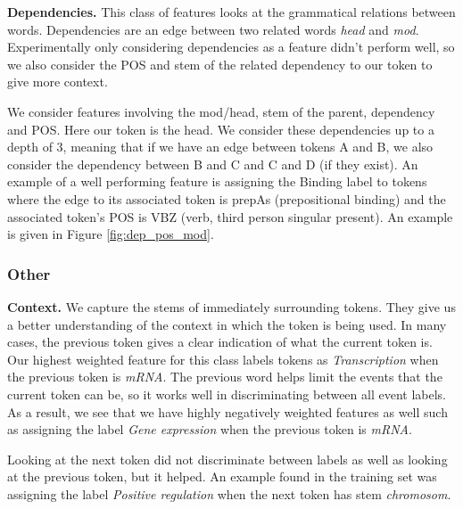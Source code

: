 \documentclass{article} %
\begin{document}
\textbf{Dependencies.} \cite{4} This class of features looks at the grammatical relations between words. Dependencies are an edge between two related words \emph{head} and \emph{mod}. Experimentally only considering dependencies as a feature didn't perform well, so we also consider the POS and stem of the related dependency to our token to give more context. 

We consider features involving the mod/head, stem of the parent, dependency and POS. Here our token is the head. We consider these dependencies up to a depth of 3, meaning that if we have an edge between tokens A and B, we also consider the dependency between B and C and C and D (if they exist). An example of a well performing feature is assigning the Binding label to tokens where the edge to its associated token is prepAs (prepositional binding) and the associated token's POS is VBZ (verb, third person singular present). An example is given in Figure \ref{fig:dep_pos_mod}.

\subsubsection{Other}

\textbf{Context.} \cite{1} We capture the stems of immediately surrounding tokens. They give us a better understanding of the context in which the token is being used. In many cases, the previous token gives a clear indication of what the current token is. Our highest weighted feature for this class labels tokens as \emph{Transcription} when the previous token is \emph{mRNA}. The previous word helps limit the events that the current token can be, so it works well in discriminating between all event labels. As a result, we see that we have highly negatively weighted features as well such as assigning the label \emph{Gene expression} when the previous token is \emph{mRNA}.

Looking at the next token did not discriminate between labels as well as looking at the previous token, but it helped. An example found in the training set was assigning the label \emph{Positive regulation} when the next token has stem \emph{chromosom}.
\end{document}
